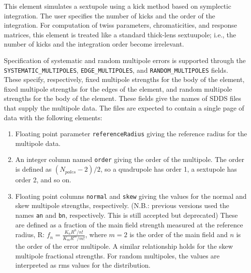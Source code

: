 This element simulates a sextupole using a kick method based on
symplectic integration.  The user specifies the number of kicks and
the order of the integration.  For computation of twiss parameters,
chromaticities, and response matrices, this element is treated like a
standard thick-lens sextuupole; i.e., the number of kicks and the
integration order become irrelevant.

\begin{raggedright}
Specification of systematic and random multipole errors is supported
through the \verb|SYSTEMATIC_MULTIPOLES|, \verb|EDGE_MULTIPOLES|, and 
\verb|RANDOM_MULTIPOLES|
fields.  These specify, respectively, fixed multipole strengths for the
body of the element, fixed multipole strengths for the edges of the element,
and random multipole strengths for the body of the element.
These fields give the names of SDDS files that supply the
multipole data.  The files are expected to contain a single page of
data with the following elements:
\end{raggedright}
\begin{enumerate}
\item Floating point parameter {\tt referenceRadius} giving the reference
 radius for the multipole data.
\item An integer column named {\tt order} giving the order of the multipole.
The order is defined as $(N_{poles}-2)/2$, so a quadrupole has order 1, a
sextupole has order 2, and so on.
\item Floating point columns {\tt normal} and {\tt skew} giving the values for the
normal and skew multipole strengths, respectively.  
(N.B.: previous versions used the names {\tt an} and {\tt bn}, respectively. This is still accepted but deprecated)
These are defined as a fraction 
of the main field strength measured at the reference radius, R: 
$f_n  = \frac{K_n R^n / n!}{K_m R^m / m!}$, where 
$m=2$ is the order of the main field and $n$ is the order of the error multipole.
A similar relationship holds for the skew multipole fractional strengths.
For random multipoles, the values are interpreted as rms values for the distribution.
\end{enumerate}

